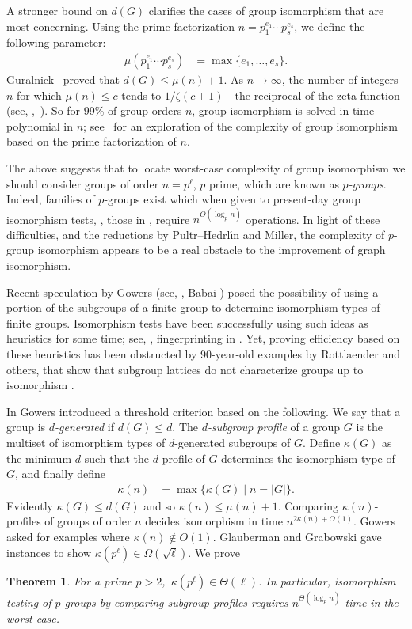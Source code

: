 \documentclass{toc}
\numberwithin{equation}{section}
\theoremstyle{plain}       %
\newtheorem{thm}[equation]{Theorem}
\theoremstyle{remark}
\theoremstyle{definition}
\numberwithin{figure}{section}
\numberwithin{table}{section}
\begin{document}
A stronger bound on $d(G)$ clarifies the cases of group isomorphism that are
most concerning.  Using the prime factorization $n=p_1^{e_1}\cdots p_s^{e_s}$,
we define the following parameter:
\begin{align}\label{def:mu}
	\mu(p_1^{e_1}\cdots p_s^{e_s}) & =\max\{e_1,\dots, e_s\}.
\end{align}
Guralnick~\cite{Guralnick} proved that $d(G)\leq \mu(n)+1$.  As
$n\to\infty$, the number of integers $n$ for which $\mu(n)\leq c$
tends to $1/\zeta(c+1)$---the reciprocal of the zeta
%
function (see, \eg,~\cite{Stark}).  %
So for 99\% of group orders $n$, group isomorphism is
solved in time polynomial in $n$; 
%
see~\cite{DW:cubefree, DW:most}    %
for an exploration of the complexity of group isomorphism based on the
prime factorization of $n$.

The above suggests that to locate worst-case complexity of group isomorphism we
should consider groups of order $n=p^{\ell}$, $p$ prime, which are known as
\emph{$p$-groups}.  Indeed, families of $p$-groups exist which when given to
present-day group isomorphism tests, \eg, those in \cite{ELGOB}, require
$n^{O(\log_p n)}$ operations.  In light of these difficulties, and the
reductions by Pultr--Hedrl{\'\i}n and Miller, the complexity of $p$-group
isomorphism appears to be a real obstacle to the improvement of graph
isomorphism. 

Recent speculation by Gowers \cite{Gowers:blog} 
%
(see, \eg, Babai \cite[p.   %
693]{Babai:graph}) posed the possibility of using a portion of the subgroups of
a finite group to determine isomorphism types of finite groups.  Isomorphism
tests have been successfully using such ideas as heuristics for some time; 
%
see, \eg, fingerprinting in \cite{ELGOB}.   %
Yet, proving efficiency based on these
heuristics has been obstructed by 90-year-old examples by Rottlaender and
others, that show that subgroup lattices do not characterize groups up to
isomorphism \cite{Rottlaender}.

In \cite{Gowers:blog} Gowers introduced a threshold criterion based on the
following.  We say that a group is \emph{$d$-generated} if $d(G)\le d$. The
\emph{$d$-subgroup profile} of a group $G$ is the multiset of isomorphism types
of $d$-generated subgroups of $G$.  Define $\kappa(G)$ as the minimum $d$ such
that the $d$-profile of $G$ determines the isomorphism type of $G$, and finally
define
\begin{align*}
	\kappa(n) & = \max\{\kappa (G) \mid n=|G|\}.
\end{align*}
Evidently $\kappa(G)\leq d(G)$ and so $\kappa(n)\leq\mu(n)+1$. Comparing
$\kappa(n)$-profiles of groups of order $n$ decides isomorphism in time
$n^{2\kappa(n)+O(1)}$.   Gowers asked for examples where $\kappa(n)\notin O(1)$.
Glauberman and Grabowski \cite{GG} gave instances to show $\kappa(p^{\ell})\in
\Omega(\sqrt{\ell})$. We prove
\begin{thm}\label{thm:main-0}
For a prime $p>2$,\ $\kappa(p^{\ell})\in \Theta(\ell)$. In particular,
isomorphism testing of $p$-groups by comparing subgroup profiles requires
$n^{\Theta(\log_p n)}$ time in the worst case.
\end{thm}
\end{document}
